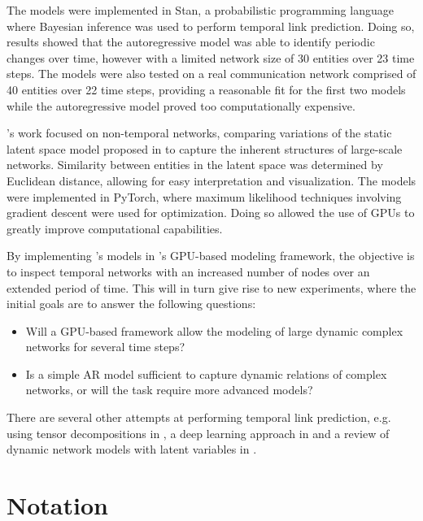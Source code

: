     The models were implemented in Stan, a probabilistic programming language where Bayesian inference was used to perform temporal link prediction. Doing so, results showed that the autoregressive model was able to identify periodic changes over time, however with a limited network size of 30 entities over 23 time steps. The models were also tested on a real communication network comprised of 40 entities over 22 time steps, providing a reasonable fit for the first two models while the autoregressive model proved too computationally expensive. 
    
    \citeauthor{jacobsen2018a}'s work focused on non-temporal networks, comparing variations of the static latent space model proposed in \cite{hoff2002latent} to capture the inherent structures of large-scale networks. 
    Similarity between entities in the latent space was determined by Euclidean distance, allowing for easy interpretation and visualization.
    The models were implemented in PyTorch, where maximum likelihood techniques involving gradient descent were used for optimization. Doing so allowed the use of GPUs to greatly improve computational capabilities.
    
    By implementing \citeauthor{zangenberg2018a}'s models in \citeauthor{jacobsen2018a}'s GPU-based modeling framework, the objective is to inspect temporal networks with an increased number of nodes over an extended period of time. This will in turn give rise to new experiments, where the initial goals are to answer the following questions:
    \begin{itemize}\itshape
        \item Will a GPU-based framework allow the modeling of large dynamic complex networks for several time steps?
        \item Is a simple AR model sufficient to capture dynamic relations of complex networks, or will the task require more advanced models?
    \end{itemize}
    
    There are several other attempts at performing temporal link prediction, e.g. using tensor decompositions in \cite{dunlavy2011temporal}, a deep learning approach in \cite{li2014deep} and a review of dynamic network models with latent variables in \cite{kim2018review}.
    
\section{Notation}

